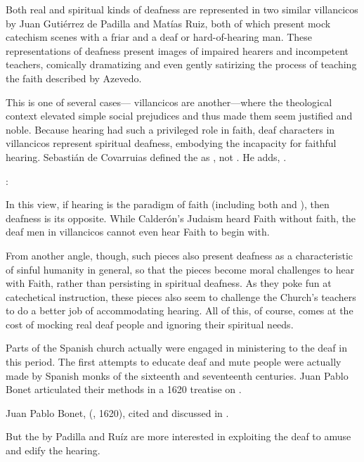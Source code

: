 Both real and spiritual kinds of deafness are represented in two similar villancicos by Juan Gutiérrez de Padilla and Matías Ruiz, both of which present mock catechism scenes with a friar and a deaf or hard-of-hearing man.
These representations of deafness present images of impaired hearers and incompetent teachers, comically dramatizing and even gently satirizing the process of teaching the faith described by Azevedo. 

This is one of several cases--- villancicos are another---where the theological context elevated simple social prejudices and thus made them seem justified and noble.\XXX
Because hearing had such a privileged role in faith, deaf characters in villancicos represent spiritual deafness, embodying the incapacity for faithful hearing.
Sebastián de Covarruias defined the  as , not .
He adds, .%
  \begin{Footnote}
  \autocite[]{Covarrubias:Tesoro}:
  \end{Footnote}
In this view, if hearing is the paradigm of faith (including both  and ), then deafness is its opposite.
While Calderón's Judaism heard Faith without faith, the deaf men in villancicos cannot even hear Faith to begin with.

From another angle, though, such pieces also present deafness as a characteristic of sinful humanity in general, so that the pieces become moral challenges to hear with Faith, rather than persisting in spiritual deafness.
As they poke fun at catechetical instruction, these pieces also seem to challenge the Church's teachers to do a better job of accommodating hearing.
All of this, of course, comes at the cost of mocking real deaf people and ignoring their spiritual needs.\XXX{}

Parts of the Spanish church actually were engaged in ministering to the deaf in this period.
The first attempts to educate deaf and mute people were actually made by Spanish monks of the sixteenth and seventeenth centuries.
Juan Pablo Bonet articulated their methods in a 1620 treatise on .%
  \begin{Footnote}
  Juan Pablo Bonet,  (\XXX, 1620), cited and discussed in \autocite{Plann:DeafEducationSpain}.
  \end{Footnote}
But the  by Padilla and Ruíz are more interested in exploiting the deaf to amuse and edify the hearing.

